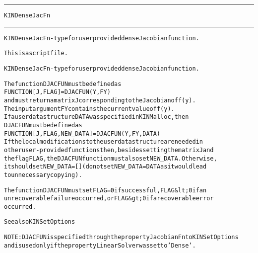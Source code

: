 \begin{samepage}
\hrule
\begin{center}
{\large \verb!KINDenseJacFn!}
\label{p:KINDenseJacFn}
\end{center}
\hrule\vspace{0.1in}



\begin{alltt}
KINDenseJacFn - type for user provided dense Jacobian function.
\end{alltt}

\end{samepage}



\begin{samepage}


\begin{alltt}
This is a script file. 
\end{alltt}

\end{samepage}



\begin{alltt}
KINDenseJacFn - type for user provided dense Jacobian function.

   The function DJACFUN must be defined as 
        FUNCTION [J, FLAG] = DJACFUN(Y,FY)
   and must return a matrix J corresponding to the Jacobian of f(y).
   The input argument FY contains the current value of f(y).
   If a user data structure DATA was specified in KINMalloc, then
   DJACFUN must be defined as
        FUNCTION [J, FLAG, NEW_DATA] = DJACFUN(Y,FY,DATA)
   If the local modifications to the user data structure are needed in
   other user-provided functions then, besides setting the matrix J and
   the flag FLAG, the DJACFUN function must also set NEW_DATA. Otherwise, 
   it should set NEW_DATA=[] (do not set NEW_DATA = DATA as it would lead
   to unnecessary copying).

   The function DJACFUN must set FLAG=0 if successful, FLAG&lt;0 if an
   unrecoverable failure occurred, or FLAG&gt;0 if a recoverable error
   occurred.

   See also KINSetOptions

   NOTE: DJACFUN is specified through the property JacobianFn to KINSetOptions
   and is used only if the property LinearSolver was set to 'Dense'.
\end{alltt}






\vspace{0.1in}